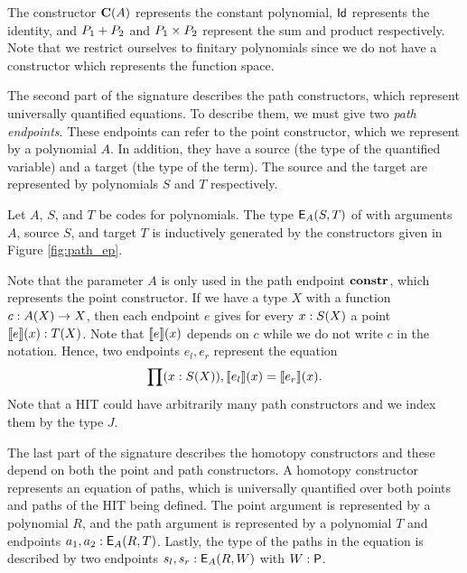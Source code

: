 The constructor $\operatorname{\mathbf{C}}(A)$ represents the constant polynomial, $\mathsf{Id}$ represents the identity,
and $P_1 + P_2$ and $P_1 \times P_2$ represent the sum and product respectively.
Note that we restrict ourselves to finitary polynomials since we do not have a constructor which represents the function space.

The second part of the signature describes the path constructors, which represent universally quantified equations.
To describe them, we must give two \emph{path endpoints}.
These endpoints can refer to the point constructor, which we represent by a polynomial $A$.
In addition, they have a source (the type of the quantified variable) and a target (the type of the term).
The source and the target are represented by polynomials $S$ and $T$ respectively.

\begin{definition}
Let $A$, $S$, and $T$ be codes for polynomials.
The type $\mathsf{E}_{A}(S,T)$ of  with arguments $A$, source  $S$, and target $T$ is inductively generated by the constructors given in Figure \ref{fig:path_ep}.
\end{definition}

Note that the parameter $A$ is only used in the path endpoint $\operatorname{\mathbf{constr}}$, which represents the point constructor.
If we have a type $X$ with a function $c : A(X) \rightarrow X$,
then each endpoint $e$ gives for every $x : S(X)$ a point $\llbracket e \rrbracket(x) : T(X)$.
Note that $\llbracket e \rrbracket(x)$ depends on $c$ while we do not write $c$ in the notation.
Hence, two endpoints $e_l, e_r$ represent the equation
\[
\prod (x : S(X)) , \llbracket e_l \rrbracket(x) = \llbracket e_r \rrbracket(x).
\]
Note that a HIT could have arbitrarily many path constructors and we index them by the type $J$.

The last part of the signature describes the homotopy constructors
and these depend on both the point and path constructors.
A homotopy constructor represents an equation of paths, which is universally quantified over both points and paths of
the HIT being defined.
The point argument is represented by a polynomial $R$, and the path argument is represented by a polynomial $T$ and endpoints $a_1, a_2 : \mathsf{E}_{A}(R,T)$.
Lastly, the type of the paths in the equation is described by two endpoints $s_l, s_r : \mathsf{E}_{A}(R,W)$ with $W : \mathsf{P}$.

